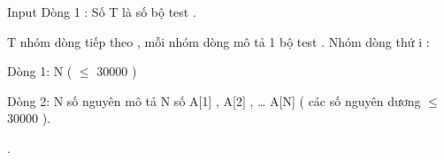 Input
Dòng 1 : Số T là số bộ test .   


   T nhóm dòng tiếp theo , mỗi nhóm dòng mô tả 1 bộ test . Nhóm dòng thứ i :   


   Dòng 1: N (  $\le$  30000 )   


   Dòng 2: N số nguyên mô tả N số A[1] , A[2] , … A[N] ( các số nguyên dương  $\le$  30000 ).   


   .